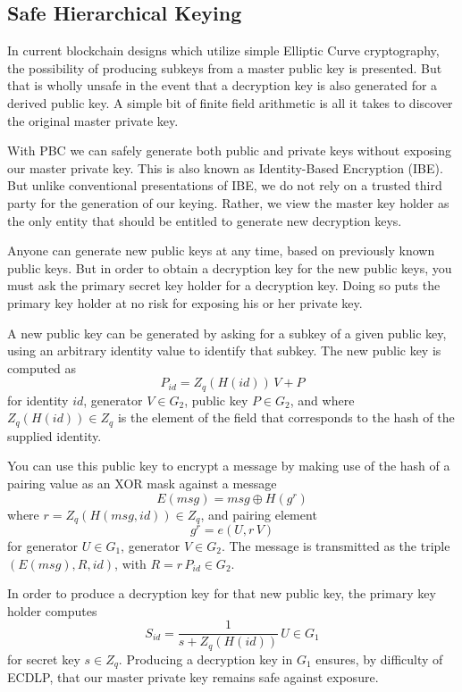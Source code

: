 \documentclass{yellowpaper}
\begin{document}
\subsection{Safe Hierarchical Keying}

In current blockchain designs which utilize simple Elliptic Curve cryptography, the possibility of producing subkeys from a master public key is presented. But that is wholly unsafe in the event that a decryption key is also generated for a derived public key. A simple bit of finite field arithmetic is all it takes to discover the original master private key.

With PBC we can safely generate both public and private keys without exposing our master private key. This is also known as Identity-Based Encryption (IBE). But unlike conventional presentations of IBE, we do not rely on a trusted third party for the generation of our keying. Rather, we view the master key holder as the only entity that should be entitled to generate new decryption keys. 

Anyone can generate new public keys at any time, based on previously known public keys.
But in order to obtain a decryption key for the new public keys, you must ask the primary secret key holder for a decryption key. Doing so puts the primary key holder at no risk for exposing his or her private key.

A new public key can be generated by asking for a subkey of a given public key, using an arbitrary identity value to identify that subkey. The new public key is computed as 
$$ P_{id} = Z_q(H(id)) \, V + P$$ 
for identity $id$, generator $V \in G_2$, public key $P \in G_2$, and where $Z_q(H(id)) \in Z_q$ is the element of the field that corresponds to the hash of the supplied identity. 

You can use this public key to encrypt a message by making use of the hash of a pairing value as an XOR mask against a message $$E(msg) = msg \oplus H(g^r)$$ where $r = Z_q(H(msg, id)) \in Z_q$, and pairing element 
$$g^r = e(U, r \, V)$$
for generator $U \in G_1$, generator $V \in G_2$. The message is transmitted as the triple $(E(msg), R, id)$, with $R = r \, P_{id} \in G_2$.

In order to produce a decryption key for that new public key, the primary key holder computes $$S_{id} = \frac{1}{s + Z_q(H(id))} \, U \in G_1$$ for secret key $s \in Z_q$. Producing a decryption key in $G_1$ ensures, by difficulty of ECDLP, that our master private key remains safe against exposure.
\end{document}
